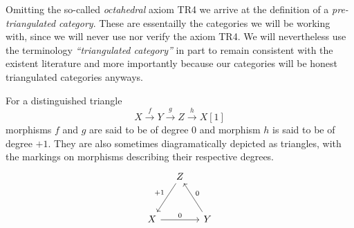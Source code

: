 Omitting the so-called \emph{octahedral} axiom TR4 we arrive at the definition of a \emph{pre-triangulated category}. These are essentailly the categories we will be working with, since we will never use nor verify the axiom TR4. We will nevertheless use the terminology \emph{``triangulated category''} in part to remain consistent with the existent literature and more importantly because our categories will be honest triangulated categories anyways.


        


\begin{remark}
    For a distinguished triangle
    \[
        X\xrightarrow{\ f \ } Y \xrightarrow{\ g \ } Z \xrightarrow{\ h \ } X[1]
    \]
    morphisms $f$ and $g$ are said to be of degree $0$ and morphism $h$ is said to be of degree $+1$. They are also sometimes diagramatically depicted as triangles, with the markings on morphisms describing their respective degrees.
    \[\begin{tikzcd}[column sep = small, row sep = 1.5em]
        & Z \\
        \\
        X && Y
        \arrow["{+1}"', from=1-2, to=3-1]
        \arrow["0", from=3-1, to=3-3]
        \arrow["0"', from=3-3, to=1-2]
    \end{tikzcd}\]
\end{remark}

